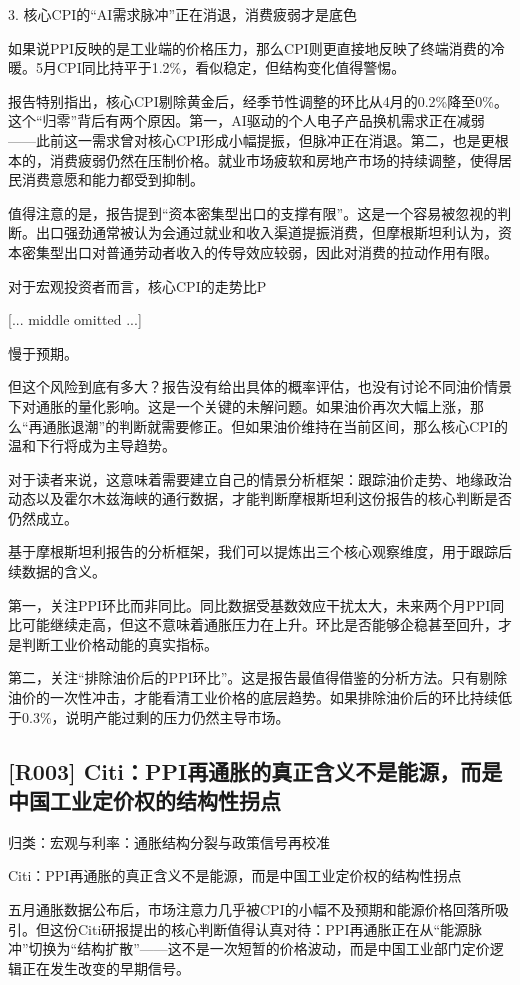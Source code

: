 \documentclass[11pt]{ctexart}
\begin{document}
3. 核心CPI的“AI需求脉冲”正在消退，消费疲弱才是底色

如果说PPI反映的是工业端的价格压力，那么CPI则更直接地反映了终端消费的冷暖。5月CPI同比持平于1.2\%，看似稳定，但结构变化值得警惕。

报告特别指出，核心CPI剔除黄金后，经季节性调整的环比从4月的0.2\%降至0\%。这个“归零”背后有两个原因。第一，AI驱动的个人电子产品换机需求正在减弱——此前这一需求曾对核心CPI形成小幅提振，但脉冲正在消退。第二，也是更根本的，消费疲弱仍然在压制价格。就业市场疲软和房地产市场的持续调整，使得居民消费意愿和能力都受到抑制。

值得注意的是，报告提到“资本密集型出口的支撑有限”。这是一个容易被忽视的判断。出口强劲通常被认为会通过就业和收入渠道提振消费，但摩根斯坦利认为，资本密集型出口对普通劳动者收入的传导效应较弱，因此对消费的拉动作用有限。

对于宏观投资者而言，核心CPI的走势比P

[... middle omitted ...]

慢于预期。

但这个风险到底有多大？报告没有给出具体的概率评估，也没有讨论不同油价情景下对通胀的量化影响。这是一个关键的未解问题。如果油价再次大幅上涨，那么“再通胀退潮”的判断就需要修正。但如果油价维持在当前区间，那么核心CPI的温和下行将成为主导趋势。

对于读者来说，这意味着需要建立自己的情景分析框架：跟踪油价走势、地缘政治动态以及霍尔木兹海峡的通行数据，才能判断摩根斯坦利这份报告的核心判断是否仍然成立。

基于摩根斯坦利报告的分析框架，我们可以提炼出三个核心观察维度，用于跟踪后续数据的含义。

第一，关注PPI环比而非同比。同比数据受基数效应干扰太大，未来两个月PPI同比可能继续走高，但这不意味着通胀压力在上升。环比是否能够企稳甚至回升，才是判断工业价格动能的真实指标。

第二，关注“排除油价后的PPI环比”。这是报告最值得借鉴的分析方法。只有剔除油价的一次性冲击，才能看清工业价格的底层趋势。如果排除油价后的环比持续低于0.3\%，说明产能过剩的压力仍然主导市场。

\subsection{[R003] Citi：PPI再通胀的真正含义不是能源，而是中国工业定价权的结构性拐点}
{\small\color{refgray}归类：宏观与利率：通胀结构分裂与政策信号再校准}

Citi：PPI再通胀的真正含义不是能源，而是中国工业定价权的结构性拐点

五月通胀数据公布后，市场注意力几乎被CPI的小幅不及预期和能源价格回落所吸引。但这份Citi研报提出的核心判断值得认真对待：PPI再通胀正在从“能源脉冲”切换为“结构扩散”——这不是一次短暂的价格波动，而是中国工业部门定价逻辑正在发生改变的早期信号。
\end{document}

